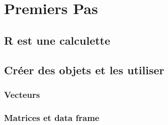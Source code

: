 \section{Premiers Pas}
\subsection{R est une calculette}

\subsection{Créer des objets et les utiliser}
\subsubsection{Vecteurs}

\subsubsection{Matrices et data frame}


